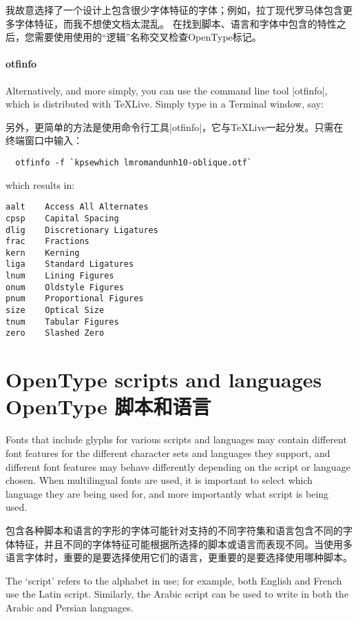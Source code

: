 \documentclass[a4paper]{l3doc}
\begin{document}
\noindent 我故意选择了一个设计上包含很少字体特征的字体；例如，拉丁现代罗马体包含更多字体特征，而我不想使文档太混乱。
在找到脚本、语言和字体中包含的特性之后，您需要使用使用的“逻辑”名称交叉检查OpenType标记。

\paragraph{otfinfo}
Alternatively, and more simply, you can use the command line tool |otfinfo|, which is distributed with \TeX{}Live.
Simply type in a Terminal window, say:

另外，更简单的方法是使用命令行工具|otfinfo|，它与\TeX{}Live一起分发。只需在终端窗口中输入：

\begin{Verbatim}
  otfinfo -f `kpsewhich lmromandunh10-oblique.otf`
\end{Verbatim}
which results in:
\begin{Verbatim}[frame=single]
aalt	Access All Alternates
cpsp	Capital Spacing
dlig	Discretionary Ligatures
frac	Fractions
kern	Kerning
liga	Standard Ligatures
lnum	Lining Figures
onum	Oldstyle Figures
pnum	Proportional Figures
size	Optical Size
tnum	Tabular Figures
zero	Slashed Zero
\end{Verbatim}


\section{OpenType scripts and languages\\OpenType 脚本和语言}\label{sec:ot}

Fonts that include glyphs for various scripts and languages may contain different font features for the different character sets and languages they support, and different font features may behave differently depending on the script or language chosen.
When multilingual fonts are used, it is important to select which language
they are being used for, and more importantly what script is being used.

包含各种脚本和语言的字形的字体可能针对支持的不同字符集和语言包含不同的字体特征，并且不同的字体特征可能根据所选择的脚本或语言而表现不同。当使用多语言字体时，重要的是要选择使用它们的语言，更重要的是要选择使用哪种脚本。

The `script' refers to the alphabet in use; for example, both English
and French use the Latin script. Similarly, the Arabic script can be used
to write in both the Arabic and Persian languages.
\end{document}
